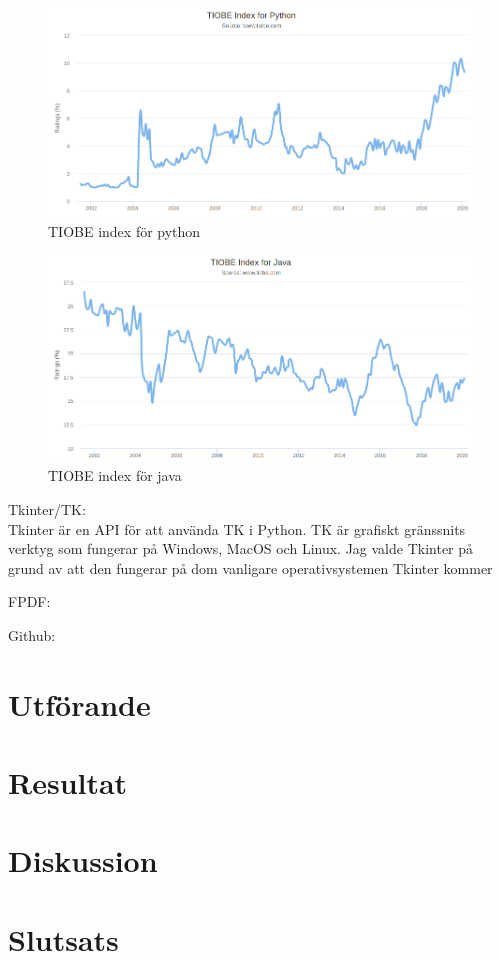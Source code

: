 \documentclass[a4paper, 12pt]{article}
\begin{document}
\begin{figure}[h!]
  \includegraphics[width=\linewidth]{img/TIOBE_python.png}
  \caption{TIOBE index för python}
  \label{fig:index_python}
\end{figure}
\begin{figure}[h!]
  \includegraphics[width=\linewidth]{img/TIOBE_java.png}
  \caption{TIOBE index för java}
  \label{fig:index_java}
\end{figure}


Tkinter/TK:\\
Tkinter är en API för att använda TK i Python. 
TK är grafiskt gränssnits verktyg som fungerar på Windows, MacOS och Linux. 
Jag valde Tkinter på grund av att den fungerar på dom vanligare operativsystemen 
Tkinter kommer 

FPDF:

Github:

\section{Utförande}

\section{Resultat}

\section{Diskussion}

\section{Slutsats}

\newpage 

{}


\end{document}
